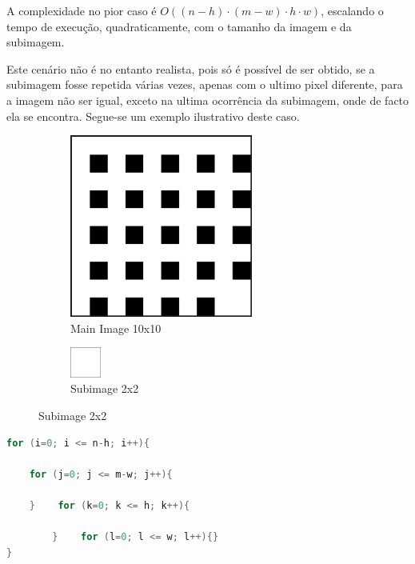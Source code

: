 \documentclass{report}
\begin{document}
A complexidade no pior caso é \(O((n-h) \cdot (m-w) \cdot h \cdot w)\), escalando o tempo de execução, quadraticamente, 
com o tamanho da imagem e da subimagem.

Este cenário não é no entanto realista, pois só é possível de ser obtido, se a subimagem fosse repetida várias vezes, apenas com o ultimo pixel diferente, para a imagem não ser igual, exceto na ultima ocorrência da subimagem, onde de facto ela se encontra. Segue-se um exemplo ilustrativo deste caso.


\begin{figure}[h]

\begin{subfigure}{0.5\textwidth}
\includegraphics[width=0.9\linewidth, height=6cm]{Screenshot from 2023-11-24 15-30-46.png}
\caption{Main Image 10x10}
\end{subfigure}
\begin{subfigure}{0.5\textwidth}
\hspace{33mm}
\includegraphics[width=0.15\linewidth, height=1cm]{Screenshot from 2023-11-24 15-33-07.png} 
\caption{Subimage 2x2}
\end{subfigure}
\end{figure}



\begingroup
\begin{lstlisting}[language=C]
for (i=0; i <= n-h; i++){
    
    for (j=0; j <= m-w; j++){
            
    }    for (k=0; k <= h; k++){
            
        }    for (l=0; l <= w; l++){}
}
\end{lstlisting}
\endgroup

\vspace{5mm}
\end{document}
